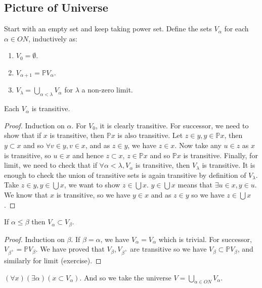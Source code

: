 \subsection{Picture of Universe}
Start with an empty set and keep taking power set. Define the sets $V_\alpha$ for each $\alpha \in ON$, inductively as:
\begin{enumerate}
\item $V_0=\emptyset$.\\
\item $V_{\alpha +1}=\mathbb{P}V_\alpha$.\\
\item $V_\lambda=\bigcup_{\alpha < \lambda}V_\alpha$ for $\lambda$ a non-zero limit.
\end{enumerate}
\begin{lemma} Each $V_\alpha$ is transitive.
\end{lemma}
\begin{proof} Induction on $\alpha$. For $V_0$, it is clearly transitive.
For successor, we need to show that if $x$ is transitive, then $\mathbb{P}x$ is also transitive. Let $z \in y, y \in \mathbb{P}x$, then $y \subset x$ and so $\forall v \in y, v \in x$, and as $z \in y$, we have $z \in x$. Now take any $u \in z$ as $x$ is transitive, so $u \in x$ and hence $z \subset x$, $z \in \mathbb{P}x$ and so $\mathbb{P}x$ is transitive. Finally, for limit, we need to check that if $\forall \alpha < \lambda ,V_\alpha$ is transitive, then $V_\lambda$ is transitive. It is enough to check the union of transitive sets is again transitive by definition of $V_\lambda$. Take $z \in y, y \in \bigcup x$, we want to show $z \in \bigcup x$. $y \in \bigcup x$ means that $\exists u \in x, y \in u$. We know that $x$ is transitive, so we have $y \in x$ and as $z \in y$ so we have $z \in \bigcup x$.
\end{proof}
\begin{lemma} If $\alpha \le \beta$ then $V_\alpha \subset V_\beta$.
\end{lemma}
\begin{proof} Induction on $\beta$.  If $\beta = \alpha$, we have $V_\alpha=V_\alpha$ which is trivial. For successor, $V_{\beta^+}=\mathbb{P}V_\beta$. We have proved that $V_\beta,V_{\beta^+}$ are transitive so we have $V_\beta \subset \mathbb{P}V_\beta$, and similarly for limit (exercise).
\end{proof}
\begin{theorem} $(\forall x)(\exists \alpha)(x \subset V_\alpha)$. And so we take the universe $V=\bigcup_{\alpha \in ON}V_\alpha$.
\end{theorem}
